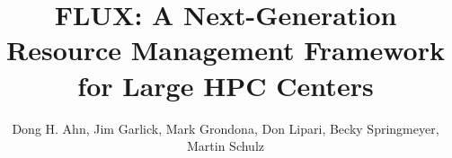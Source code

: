 \documentclass[conference]{IEEEtran}
\begin{document}
\title{FLUX: A Next-Generation Resource Management Framework for Large HPC Centers}
\author{Dong H. Ahn, Jim Garlick, Mark Grondona, Don Lipari, Becky Springmeyer, \\
        Martin Schulz}

\date{}
\maketitle


\newcommand{\flux}{Flux}
\newcommand{\zMQ}{\O{}MQ}










%

%






\end{document}
